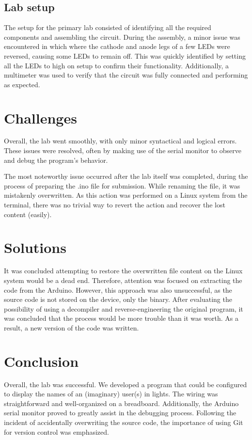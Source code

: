 \documentclass[fleqn]{article}
\begin{document}
\subsection{Lab setup}
The setup for the primary lab consisted of identifying all the required components and assembling the circuit. During the assembly, a minor issue was encountered in which where the cathode and anode legs of a few LEDs were reversed, causing some LEDs to remain off. This was quickly identified by setting all the LEDs to high on setup to confirm their functionality. Additionally, a multimeter was used to verify that the circuit was fully connected and performing as expected.

\section{Challenges}
Overall, the lab went smoothly, with only minor syntactical and logical errors. These issues were resolved, often by making use of the serial monitor to observe and debug the program's behavior.

The most noteworthy issue occurred after the lab itself was completed, during the process of preparing the .ino file for submission. While renaming the file, it was mistakenly overwritten. As this action was performed on a Linux system from the terminal, there was no trivial way to revert the action and recover the lost content (easily). 
\section{Solutions}

It was concluded attempting to restore the overwritten file content on the Linux system would be a dead end. Therefore, attention was focused on extracting the code from the Arduino. However, this approach was also unsuccessful, as the source code is not stored on the device, only the binary. After evaluating the possibility of using a decompiler and reverse-engineering the original program, it was concluded that the process would be more trouble than it was worth. As a result, a new version of the code was written.
\section{Conclusion}
    Overall, the lab was successful. We developed a program that could be configured to display the names of an (imaginary) user(s) in lights. The wiring was straightforward and well-organized on a breadboard. Additionally, the Arduino serial monitor proved to greatly assist in the debugging process. Following the incident of accidentally overwriting the source code, the importance of using Git for version control was emphasized.
\end{document}
